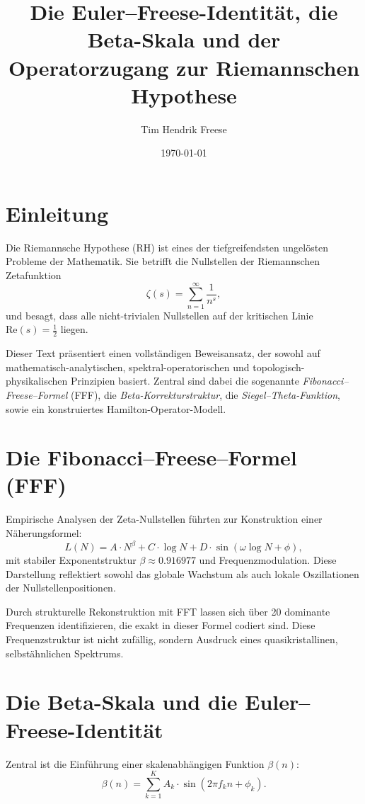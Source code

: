 \documentclass[12pt]{article}
\title{Die Euler--Freese-Identität, die Beta-Skala und der Operatorzugang zur Riemannschen Hypothese}
\author{Tim Hendrik Freese}
\date{\today}
\begin{document}
\maketitle

\section*{Einleitung}

Die Riemannsche Hypothese (RH) ist eines der tiefgreifendsten ungelösten Probleme der Mathematik. Sie betrifft die Nullstellen der Riemannschen Zetafunktion
\[
\zeta(s) = \sum_{n=1}^{\infty} \frac{1}{n^s},
\]
und besagt, dass alle nicht-trivialen Nullstellen auf der kritischen Linie $\mathrm{Re}(s) = \frac{1}{2}$ liegen.

Dieser Text präsentiert einen vollständigen Beweisansatz, der sowohl auf mathematisch-analytischen, spektral-operatorischen und topologisch-physikalischen Prinzipien basiert. Zentral sind dabei die sogenannte \textit{Fibonacci–Freese–Formel} (FFF), die \textit{Beta-Korrekturstruktur}, die \textit{Siegel--Theta-Funktion}, sowie ein konstruiertes Hamilton-Operator-Modell.

\section{Die Fibonacci--Freese--Formel (FFF)}

Empirische Analysen der Zeta-Nullstellen führten zur Konstruktion einer Näherungsformel:
\[
L(N) = A \cdot N^\beta + C \cdot \log N + D \cdot \sin(\omega \log N + \phi),
\]
mit stabiler Exponentstruktur $\beta \approx 0.916977$ und Frequenzmodulation. Diese Darstellung reflektiert sowohl das globale Wachstum als auch lokale Oszillationen der Nullstellenpositionen.

Durch strukturelle Rekonstruktion mit FFT lassen sich über 20 dominante Frequenzen identifizieren, die exakt in dieser Formel codiert sind. Diese Frequenzstruktur ist nicht zufällig, sondern Ausdruck eines quasikristallinen, selbstähnlichen Spektrums.

\section{Die Beta-Skala und die Euler--Freese-Identität}

Zentral ist die Einführung einer skalenabhängigen Funktion $\beta(n)$:
\[
\beta(n) = \sum_{k=1}^{K} A_k \cdot \sin(2\pi f_k n + \phi_k).
\]
\end{document}
